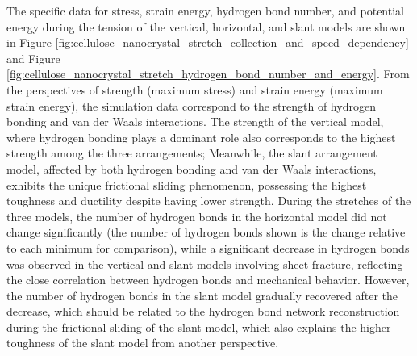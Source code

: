 \documentclass{article}
\begin{document}
The specific data for stress, strain energy, hydrogen bond number, and potential energy during the tension of the vertical, horizontal, and slant models are shown in Figure \ref{fig:cellulose_nanocrystal_stretch_collection_and_speed_dependency} and Figure \ref{fig:cellulose_nanocrystal_stretch_hydrogen_bond_number_and_energy}.
From the perspectives of strength (maximum stress) and strain energy (maximum strain energy), the simulation data correspond to the strength of hydrogen bonding and van der Waals interactions.
The strength of the vertical model, where hydrogen bonding plays a dominant role also corresponds to the highest strength among the three arrangements;
Meanwhile, the slant arrangement model, affected by both hydrogen bonding and van der Waals interactions, exhibits the unique frictional sliding phenomenon, possessing the highest toughness and ductility despite having lower strength.
During the stretches of the three models, the number of hydrogen bonds in the horizontal model did not change significantly (the number of hydrogen bonds shown is the change relative to each minimum for comparison),
while a significant decrease in hydrogen bonds was observed in the vertical and slant models involving sheet fracture, reflecting the close correlation between hydrogen bonds and mechanical behavior.
However, the number of hydrogen bonds in the slant model gradually recovered after the decrease, which should be related to the hydrogen bond network reconstruction during the frictional sliding of the slant model, which also explains the higher toughness of the slant model from another perspective.
\end{document}

